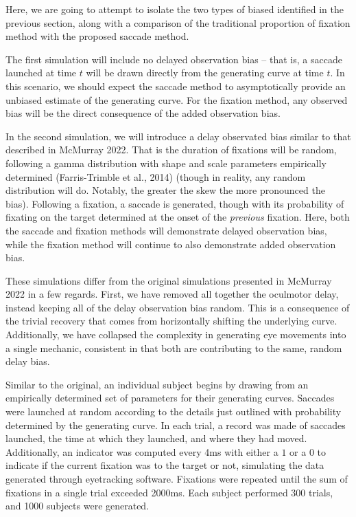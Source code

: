 \documentclass{article}
\begin{document}
Here, we are going to attempt to isolate the two types of biased identified in the previous section, along with a comparison of the traditional proportion of fixation method with the proposed saccade method.

The first simulation will include no delayed observation bias -- that is, a saccade launched at time $t$ will be drawn directly from the generating curve at time $t$. In this scenario, we should expect the saccade method to asymptotically provide an unbiased estimate of the generating curve. For the fixation method, any observed bias will be the direct consequence of the added observation bias.

In the second simulation, we will introduce a delay observated bias similar to that described in McMurray 2022. That is the duration of fixations will be random, following a gamma distribution with shape and scale parameters empirically determined (Farris-Trimble et al., 2014) (though in reality, any random distribution will do. Notably, the greater the skew the more pronounced the bias). Following a fixation, a saccade is generated, though with its probability of fixating on the target determined at the onset of the \textit{previous} fixation. Here, both the saccade and fixation methods will demonstrate delayed observation bias, while the fixation method will continue to also demonstrate added observation bias.

These simulations differ from the original simulations presented in McMurray 2022 in a few regards. First, we have removed all together the oculmotor delay, instead keeping all of the delay observation bias random. This is a consequence of the trivial recovery that comes from horizontally shifting the underlying curve. Additionally, we have collapsed the complexity in generating eye movements into a single mechanic, consistent in that both are contributing to the same, random delay bias.

Similar to the original, an individual subject begins by drawing from an empirically determined set of parameters for their generating curves. Saccades were launched at random according to the details just outlined with probability determined by the generating curve. In each trial, a record was made of saccades launched, the time at which they launched, and where they had moved. Additionally, an indicator was computed every 4ms with either a $1$ or a $0$ to indicate if the current fixation was to the target or not, simulating the data generated through eyetracking software. Fixations were repeated until the sum of fixations in a single trial exceeded 2000ms. Each subject performed 300 trials, and 1000 subjects were generated.
\end{document}
